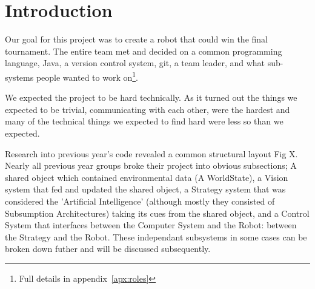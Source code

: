 \section{Introduction}

Our goal for this project was to create a robot that could win the final
tournament. The entire team met and decided on a common programming language,
Java, a version control system, git, a team leader, and what sub-systems people
wanted to work on\footnote{Full details in appendix~\ref{apx:roles}}.

We expected the project to be hard technically. As it turned out the things we
expected to be trivial, communicating with each other, were the hardest and
many of the technical things we expected to find hard were less so than we
expected.

Research into previous year's code revealed a common structural layout Fig X. 
Nearly all previous year groups broke their project into obvious subsections; 
A shared object which contained environmental data (A WorldState), a Vision 
system that fed and updated the shared object, a Strategy system that was 
considered the 'Artificial Intelligence' (although mostly they consisted of 
Subsumption Architectures) taking its cues from the shared object, and a Control 
System that interfaces between the Computer System and the Robot: between the 
Strategy and the Robot. These independant subsystems in some cases can be broken 
down futher and will be discussed subsequently. 
